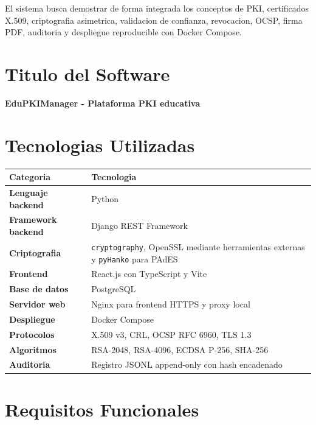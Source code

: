 \documentclass[12pt,a4paper]{article}
\begin{document}
El sistema busca demostrar de forma integrada los conceptos de PKI, certificados X.509, criptografia asimetrica, validacion de confianza, revocacion, OCSP, firma PDF, auditoria y despliegue reproducible con Docker Compose.

\section{Titulo del Software}

\textbf{EduPKIManager - Plataforma PKI educativa}

\section{Tecnologias Utilizadas}

\begin{longtable}{>{\bfseries}p{4cm}p{10cm}}
\toprule
Categoria & Tecnologia \\
\midrule
Lenguaje backend & Python \\
Framework backend & Django REST Framework \\
Criptografia & \texttt{cryptography}, OpenSSL mediante herramientas externas y \texttt{pyHanko} para PAdES \\
Frontend & React.js con TypeScript y Vite \\
Base de datos & PostgreSQL \\
Servidor web & Nginx para frontend HTTPS y proxy local \\
Despliegue & Docker Compose \\
Protocolos & X.509 v3, CRL, OCSP RFC 6960, TLS 1.3 \\
Algoritmos & RSA-2048, RSA-4096, ECDSA P-256, SHA-256 \\
Auditoria & Registro JSONL append-only con hash encadenado \\
\bottomrule
\end{longtable}

\section{Requisitos Funcionales}
\end{document}
